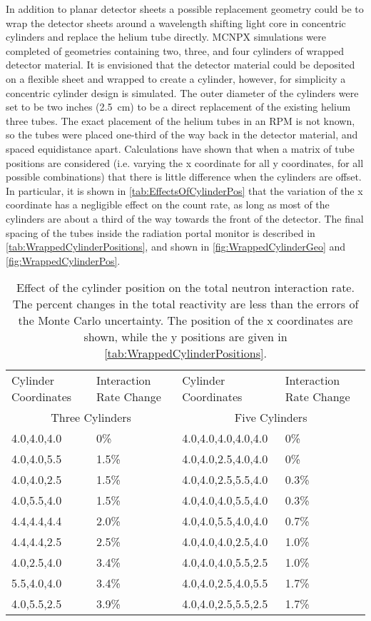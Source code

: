 In addition to planar detector sheets a possible replacement geometry could be to wrap the detector sheets around a wavelength shifting light core in concentric cylinders and replace the helium tube directly.
MCNPX simulations were completed of geometries containing two, three, and four cylinders of wrapped detector material.
It is envisioned that the detector material could be deposited on a flexible sheet and wrapped to create a cylinder, however, for simplicity a concentric cylinder design is simulated.
The outer diameter of the cylinders were set to be two inches (\SI{2.5}{\cm}) to be a direct replacement of the existing helium three tubes.
The exact placement of the helium tubes in an RPM is not known, so the tubes were placed one-third of the way back in the detector material, and spaced equidistance apart.
Calculations have shown that when a matrix of tube positions are considered (i.e. varying the x coordinate for all y coordinates, for all possible combinations) that there is little difference when the cylinders are offset.
In particular, it is shown in \autoref{tab:EffectsOfCylinderPos} that the variation of the x coordinate has a negligible effect on the count rate, as long as most of the cylinders are about a third of the way towards the front of the detector.
The final spacing of the tubes inside the radiation portal monitor is described in \autoref{tab:WrappedCylinderPositions}, and shown in \autoref{fig:WrappedCylinderGeo} and \autoref{fig:WrappedCylinderPos}.
\begin{table}
  \caption[Cylinder Position Effects on Interaction Rate]{Effect of the cylinder position on the total neutron interaction rate.  The percent changes in the total reactivity are less than the errors of the Monte Carlo uncertainty. The position of the x coordinates are shown, while the y positions are given in \autoref{tab:WrappedCylinderPositions}.}
  \label{tab:EffectsOfCylinderPos}
  \begin{tabular}{p{3.5cm} m{3cm} | p{3.5cm} m{3cm}}
  \toprule
  Cylinder Coordinates & Interaction Rate Change & Cylinder Coordinates & Interaction Rate Change \\
  \multicolumn{2}{c|}{Three Cylinders} & \multicolumn{2}{c}{Five Cylinders} \\
  \midrule
   4.0,4.0,4.0 & 0\%   & 4.0,4.0,4.0,4.0,4.0 & 0\%   \\
   4.0,4.0,5.5 & 1.5\% & 4.0,4.0,2.5,4.0,4.0 & 0\%   \\
   4.0,4.0,2.5 & 1.5\% & 4.0,4.0,2.5,5.5,4.0 & 0.3\% \\
   4.0,5.5,4.0 & 1.5\% & 4.0,4.0,4.0,5.5,4.0 & 0.3\% \\
   4.4,4.4,4.4 & 2.0\% & 4.0,4.0,5.5,4.0,4.0 & 0.7\% \\
   4.4,4.4,2.5 & 2.5\% & 4.0,4.0,4.0,2.5,4.0 & 1.0\% \\
   4.0,2.5,4.0 & 3.4\% & 4.0,4.0,4.0,5.5,2.5 & 1.0\% \\
   5.5,4.0,4.0 & 3.4\% & 4.0,4.0,2.5,4.0,5.5 & 1.7\% \\
   4.0,5.5,2.5 & 3.9\% & 4.0,4.0,2.5,5.5,2.5 & 1.7\% \\
  \bottomrule
  \end{tabular}
\end{table}
